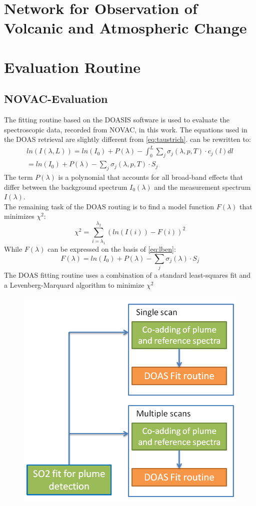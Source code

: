\documentclass  [
  paper    = a4,
  BCOR     = 10mm,
  twoside,
  fontsize = 12pt,
  fleqn,
  toc      = bibnumbered,
  toc      = listofnumbered,
  numbers  = noendperiod,
  headings = normal,
  listof   = leveldown,
  version  = 3.03
]                                       {scrreprt}
\begin{document}
	
	\chapter{Network for Observation of Volcanic and Atmospheric Change \label{NOVAC}}
	
	
	\chapter{Evaluation Routine}
	\section{NOVAC-Evaluation}
		The fitting routine based on the DOASIS software \cite{kraus2006doasis} is used to evaluate the spectroscopic data, recorded from NOVAC, in this work.
		The equations used in the DOAS retrieval are slightly different from \cref{eq:taustrich}.
		 can be rewritten to:
		\begin{align}
		ln\left(I\left(\lambda, L\right)\right) = ln\left(I_0 \right) + P \left(\lambda\right) -	\int_{0}^{L}\sum_{j}\sigma_j \left(\lambda, p, T \right) \cdot c_j \left(l\right)dl\\
		= ln\left(I_0 \right) + P \left(\lambda\right)-
		\sum_{j}\sigma_j \left(\lambda, p, T \right) \cdot S_j
		\label{eq:lben}
		\end{align}
		The term $ P \left(\lambda\right)$ is a polynomial that accounts for all broad-band effects that differ between the background spectrum $I_0\left(\lambda\right)$ and the measurement spectrum $I\left(\lambda\right)$.\\
		The remaining task of the DOAS routing is to find a model function $F \left(\lambda\right)$ that minimizes $\chi^2$:
		\begin{equation}
		\chi^2 = \sum_{i=\lambda_1}^{\lambda_2}\left(ln(I(i))-F(i)\right)^2
		\end{equation}
		While $F\left(\lambda\right)$ can be expressed on the basis of \cref{eq:lben}:
		\begin{equation}
		F\left(\lambda\right) = ln\left(I_0 \right) + P \left(\lambda\right)-
		\sum_{j}\sigma_j \left(\lambda\right) \cdot S_j
		\end{equation}
		The DOAS fitting routine uses a combination of a standard least-squares fit and a Levenberg-Marquard algorithm to minimize $\chi^2$
		\begin{figure}[h!]
		\centering
		\includegraphics[width=0.5\linewidth]{Bilder/Simon/Bilder_Tung/Algorithm}
		\caption{}
		\label{fig:algorithm}
	\end{figure}
\end{document}
